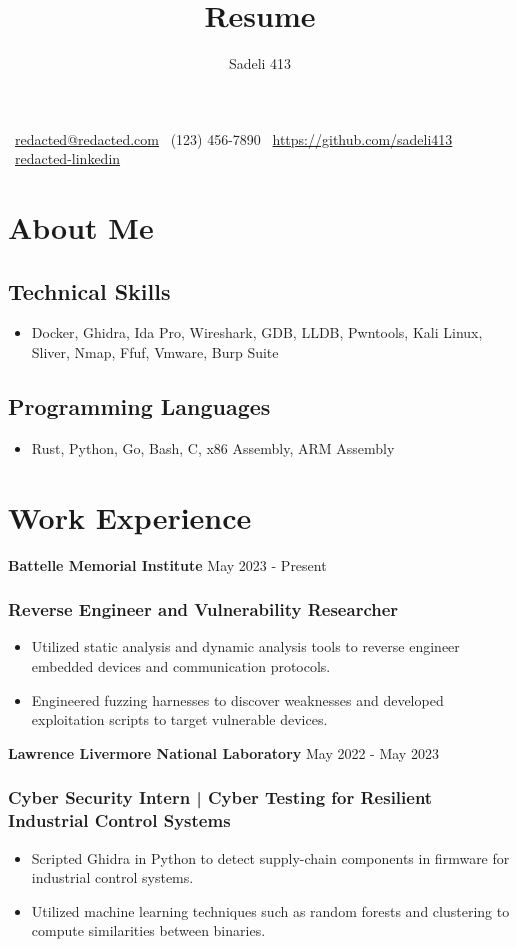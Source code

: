 \documentclass{article}
\makeatletter
\renewcommand{\maketitle}{
  \begin{center}
  {\Large \theauthor}
  {\vspace{0.1in}}

  \faEnvelopeO \ \href{mailto:redacted@redacted.com}{redacted@redacted.com} \hspace{.2in} \faMobile \ (123) 456-7890 \hspace{.2in} \faGithubSquare \ \url{https://github.com/sadeli413} \hspace{.2in} \faLinkedinSquare \ \href{https://www.linkedin.com}{redacted-linkedin} \hspace{.2in}
  \end{center} 
}
\newcommand{\resumesubsection}[2]{
	\noindent \textbf{#1} \hfill #2
}
\makeatother
\begin{document}
\title{Resume}
\author{Sadeli 413}
\maketitle

\section{About Me}

\subsection{Technical Skills}
\begin{itemize}
	\item Docker, Ghidra, Ida Pro, Wireshark, GDB, LLDB, Pwntools, Kali Linux, Sliver, Nmap, Ffuf, Vmware, Burp Suite
\end{itemize}
\subsection{Programming Languages}
\begin{itemize}
  \item Rust, Python, Go, Bash, C, x86 Assembly, ARM Assembly
\end{itemize}

\section{Work Experience}

\resumesubsection{Battelle Memorial Institute}{May 2023 - Present}
\subsubsection{Reverse Engineer and Vulnerability Researcher}
\begin{itemize}
  \item Utilized static analysis and dynamic analysis tools to reverse engineer embedded devices and communication protocols.
  \item Engineered fuzzing harnesses to discover weaknesses and developed exploitation scripts to target vulnerable devices.
\end{itemize}

\resumesubsection{Lawrence Livermore National Laboratory}{May 2022 - May 2023}
\subsubsection{Cyber Security Intern | Cyber Testing for Resilient Industrial Control Systems}
\begin{itemize}
  \item Scripted Ghidra in Python to detect supply-chain components in firmware for industrial control systems.
  \item Utilized machine learning techniques such as random forests and clustering to compute similarities between binaries.
\end{itemize}
\end{document}
